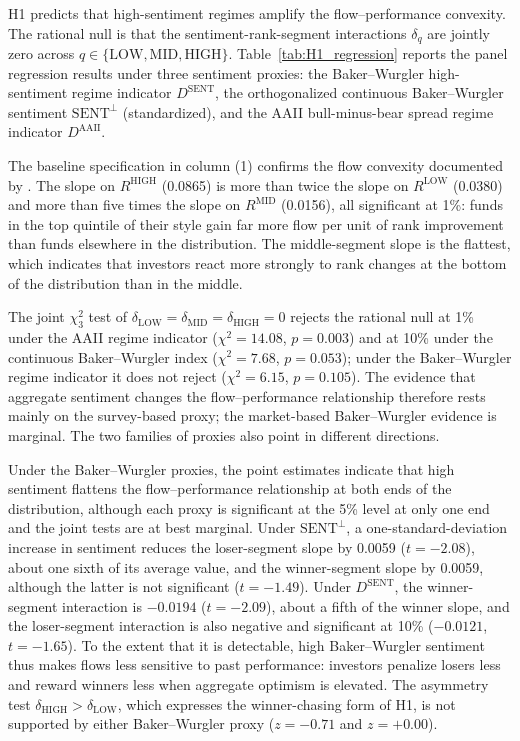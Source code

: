 \documentclass[12pt, oneside]{report}
\begin{document}
\noindent H1 predicts that high-sentiment regimes amplify the
flow--performance convexity. The rational null is that the
sentiment-rank-segment interactions $\delta_q$ are jointly zero across
$q \in \{\text{LOW}, \text{MID}, \text{HIGH}\}$.
Table~\ref{tab:H1_regression} reports the panel regression results under
three sentiment proxies: the Baker--Wurgler high-sentiment regime
indicator $D^{\text{SENT}}$, the orthogonalized continuous Baker--Wurgler
sentiment $\text{SENT}^{\perp}$ (standardized), and the AAII
bull-minus-bear spread regime indicator $D^{\text{AAII}}$.



The baseline specification in column (1) confirms the flow convexity
documented by \textcite{SirriTufano1998}. The slope on $R^{\text{HIGH}}$
(0.0865) is more than twice the slope on $R^{\text{LOW}}$ (0.0380) and more
than five times the slope on $R^{\text{MID}}$ (0.0156), all significant at
1\%: funds in the top quintile of their style gain far more flow per unit
of rank improvement than funds elsewhere in the distribution. The
middle-segment slope is the flattest, which indicates that investors
react more strongly to rank changes at the bottom of the distribution
than in the middle.

The joint $\chi^2_3$ test of
$\delta_{\text{LOW}} = \delta_{\text{MID}} = \delta_{\text{HIGH}} = 0$
rejects the rational null at 1\% under the AAII regime indicator
($\chi^2 = 14.08$, $p = 0.003$) and at 10\% under the continuous
Baker--Wurgler index ($\chi^2 = 7.68$, $p = 0.053$); under the
Baker--Wurgler regime indicator it does not reject ($\chi^2 = 6.15$,
$p = 0.105$). The evidence that aggregate sentiment changes the
flow--performance relationship therefore rests mainly on the survey-based
proxy; the market-based Baker--Wurgler evidence is marginal. The two
families of proxies also point in different directions.

Under the Baker--Wurgler proxies, the point estimates indicate that high
sentiment flattens the flow--performance relationship at both ends
of the distribution, although each proxy is significant at the 5\% level
at only one end and the joint tests are at best marginal. Under
$\text{SENT}^{\perp}$, a one-standard-deviation increase in sentiment
reduces the loser-segment slope by 0.0059 ($t = -2.08$), about one sixth
of its average value, and the winner-segment slope by 0.0059, although
the latter is not significant ($t = -1.49$). Under $D^{\text{SENT}}$, the winner-segment interaction is
$-0.0194$ ($t = -2.09$), about a fifth of the winner slope, and the
loser-segment interaction is also negative and significant at 10\%
($-0.0121$, $t = -1.65$). To the
extent that it is detectable, high Baker--Wurgler sentiment thus makes
flows less sensitive to past performance: investors penalize
losers less and reward winners less when aggregate optimism is
elevated. The asymmetry test
$\delta_{\text{HIGH}} > \delta_{\text{LOW}}$, which expresses the
winner-chasing form of H1, is not supported by either Baker--Wurgler
proxy ($z = -0.71$ and $z = +0.00$).
\end{document}
